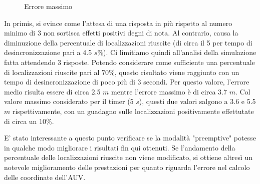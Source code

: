 \documentclass[Lau,binding=0.6cm]{sapthesis}
\begin{document}
\begin{figure}[H]
    \centering
    \hfill
    \caption{Errore massimo}
\end{figure}

In primis, si evince come l'attesa di una risposta in più rispetto al numero minimo di 3 non sortisca effetti positivi degni di nota. Al contrario, causa la diminuzione della percentuale di localizzazioni riuscite (di circa il 5 per tempo di desincronizzazione pari a 4.5 $s$\%).
Ci limitiamo quindi all'analisi della simulazione fatta attendendo 3 risposte.
Potendo considerare come sufficiente una percentuale di localizzazioni riuscite pari al 70\%, questo risultato viene raggiunto con un tempo di desincronizzazione di poco più di 3 secondi. Per questo valore, l'errore medio risulta essere di circa 2.5 $m$ mentre l'errore massimo è di circa 3.7 $m$.
Col valore massimo considerato per il timer (5 $s$), questi due valori salgono a 3.6 e 5.5 $m$ rispettivamente, con un guadagno sulle localizzazioni positivamente effettutate di circa un 10\%.

E' stato interessante a questo punto verificare se la modalità "preemptive" potesse in qualche modo migliorare i risultati fin qui ottenuti.
Se l'andamento della percentuale delle localizzazioni riuscite non viene modificato, si ottiene altresì un notevole miglioramento delle prestazioni per quanto riguarda l'errore nel calcolo delle coordinate dell'AUV.
\end{document}
